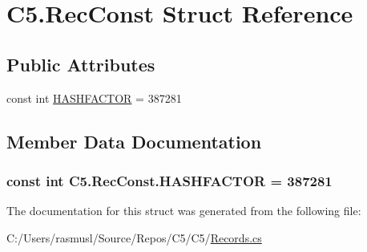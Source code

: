 \hypertarget{struct_c5_1_1_rec_const}{}\section{C5.\+Rec\+Const Struct Reference}
\label{struct_c5_1_1_rec_const}
\subsection*{Public Attributes}
\begin{DoxyCompactItemize}
\item 
const int \hyperlink{struct_c5_1_1_rec_const_a0e92ffc468e63a09fb94784b7a3a8652}{H\+A\+S\+H\+F\+A\+C\+T\+O\+R} = 387281
\end{DoxyCompactItemize}


\subsection{Member Data Documentation}
\hypertarget{struct_c5_1_1_rec_const_a0e92ffc468e63a09fb94784b7a3a8652}{}
\subsubsection[{H\+A\+S\+H\+F\+A\+C\+T\+O\+R}]{\setlength{\rightskip}{0pt plus 5cm}const int C5.\+Rec\+Const.\+H\+A\+S\+H\+F\+A\+C\+T\+O\+R = 387281}\label{struct_c5_1_1_rec_const_a0e92ffc468e63a09fb94784b7a3a8652}


The documentation for this struct was generated from the following file\+:\begin{DoxyCompactItemize}
\item 
C\+:/\+Users/rasmusl/\+Source/\+Repos/\+C5/\+C5/\hyperlink{_records_8cs}{Records.\+cs}\end{DoxyCompactItemize}

